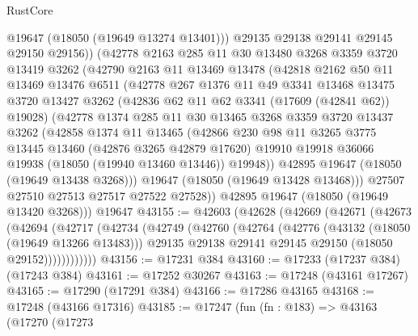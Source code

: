 \begin{lexlean}{RustCore}
\begin{coremodule}
          @19647
          (@18050 (@19649 @13274 @13401)))
        @29135
        @29138
        @29141
        @29145
        @29150
        @29156))
    (@42778
      @2163
      @285
      @11
      @30
      @13480
      @3268
      @3359
      @3720
      @13419
      @3262
      (@42790
        @2163
        @11
        @13469
        @13478
        (@42818
          @2162
          @50
          @11
          @13469
          @13476
          @6511
          (@42778
            @267
            @1376
            @11
            @49
            @3341
            @13468
            @13475
            @3720
            @13427
            @3262
            (@42836 @62 @11 @62 @3341 (@17609 (@42841 @62)) @19028)
            (@42778
              @1374
              @285
              @11
              @30
              @13465
              @3268
              @3359
              @3720
              @13437
              @3262
              (@42858
                @1374
                @11
                @13465
                (@42866
                  @230
                  @98
                  @11
                  @3265
                  @3775
                  @13445
                  @13460
                  (@42876 @3265 @42879 @17620)
                  @19910
                  @19918
                  @36066
                  @19938
                  (@18050 (@19940 @13460 @13446))
                  @19948))
              @42895
              @19647
              (@18050 (@19649 @13438 @3268)))
            @19647
            (@18050 (@19649 @13428 @13468)))
          @27507
          @27510
          @27513
          @27517
          @27522
          @27528))
      @42895
      @19647
      (@18050 (@19649 @13420 @3268)))
    @19647
@43155 := @42603
    (@42628
      (@42669
        (@42671
          (@42673
            (@42694
              (@42717
                (@42734
                  (@42749
                    (@42760
                      (@42764
                        (@42776
                          (@43132 (@18050 (@19649 @13266 @13483)))
                          @29135
                          @29138
                          @29141
                          @29145
                          @29150
                          (@18050 @29152))))))))))))
@43156 := @17231 @384
@43160 := @17233 (@17237 @384) (@17243 @384)
@43161 := @17252 @30267
@43163 := @17248 (@43161 @17267)
@43165 := @17290 (@17291 @384)
@43166 := @17286 @43165
@43168 := @17248 (@43166 @17316)
@43185 := @17247
    (fun (fn : @183) =>
    @43163
      (@17270
        (@17273

\end{coremodule}
\end{lexlean}
